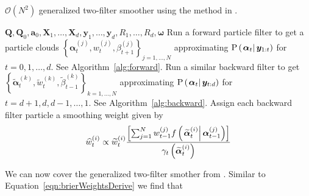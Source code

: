\documentclass[notitlepage]{article}
\newcommand\StateXX{\Statex\hspace{\algorithmicindent}\hspace{\algorithmicindent}}
\renewcommand{\vec}[1]{\bm{#1}}
\newcommand{\mat}[1]{\mathbf{#1}}
\newcommand{\Lbrac}[1]{\left[ #1\right]}
\newcommand{\Lbrace}[1]{\left\{ #1\right\}}
\newcommand{\Lparen}[1]{\left( #1\right)}
\newcommand{\Cond}[2]{\left. #1 \vphantom{#2} \right\vert  #2}
\newcommand{\Prob}{\text{P}}
\newcommand{\optor}[2]{#1\Lparen{#2}}
\newcommand{\optorC}[3]{\optor{#1}{\Cond{#2}{#3}}}
\newcommand{\propC}[2]{\optorC{\Prob}{#1}{#2}}
\newcommand{\partic}[3]{#1_{#2}^{\Lparen{#3}}}
\newcommand{\particB}[3]{\widetilde{#1}_{#2}^{\Lparen{#3}}}
\newcommand{\particS}[3]{\widehat{#1}_{#2}^{\Lparen{#3}}}
\newcommand{\bigO}[1]{\mathcal{O}\Lparen{#1}}
\newcommand{\nPart}{N}
\newcommand{\nPeriods}{d}
\begin{document}
\begin{algorithm}[H]
\caption{$\bigO{\nPart^2}$ generalized two-filter smoother using the method in \citet{briers09}.}\label{alg:ON2smoother}
\begin{algorithmic}[1]\raggedright
\INPUT
\Statex $\mat{Q},\mat{Q}_0,\vec{a}_0,\mat{X}_1,\dots,\mat{X}_d,\vec{y}_1,\dots,\vec{y}_d,R_1,\dots,R_d,\vec{\omega}$
%
\State Run a forward particle filter to get a particle clouds %
	$\Lbrace{\partic{\vec{\alpha}}{t}{j}, \partic{w}{t}{j}, \partic{\beta}{t + 1}{j}}_{j=1,\dots,N}$ %
	approximating $\propC{\vec{\alpha}_t}{\vec{y}_{1:t}}$ for $t = 0, 1, \dots, \nPeriods$. See Algorithm~\ref{alg:forward}.
\EndProcedure
%
\State Run a similar backward filter to get %
	$\Lbrace{\particB{\vec{\alpha}}{t}{k}, \particB{w}{t}{k}, \particB{\beta}{t - 1}{k}}_{k=1,\dots,N}$  %
	approximating $\propC{\vec{\alpha}_t}{\vec{y}_{t:\nPeriods}}$ for $t = \nPeriods + 1, \nPeriods, \nPeriods-1, \dots, 1$. See Algorithm~\ref{alg:backward}.
\EndProcedure
%
\For{$t=1,\dots, \nPeriods$}
\State Assign each backward filter particle a smoothing weight given by
\StateXX \begin{equation}\label{eqn:combineWeightO2}
\particS{w}{t}{i} \propto
	\particB{w}{t}{i} \frac{\Lbrac{
		\sum_{j = 1}^\nPart \partic{w}{t - 1}{j}
		\optorC{f}{\particB{\vec{\alpha}}{t}{i}}{\partic{\vec{\alpha}}{t - 1}{j}}
	}}{ \optor{\gamma_t}{\particB{\vec{\alpha}}{t}{i}}}
\end{equation}
\EndFor
\EndProcedure
\end{algorithmic}
\end{algorithm}

We can now cover the generalized two-filter smother from \cite{fearnhead10}. Similar to Equation~\eqref{eqn:brierWeightsDerive} we find that 
\end{document}
